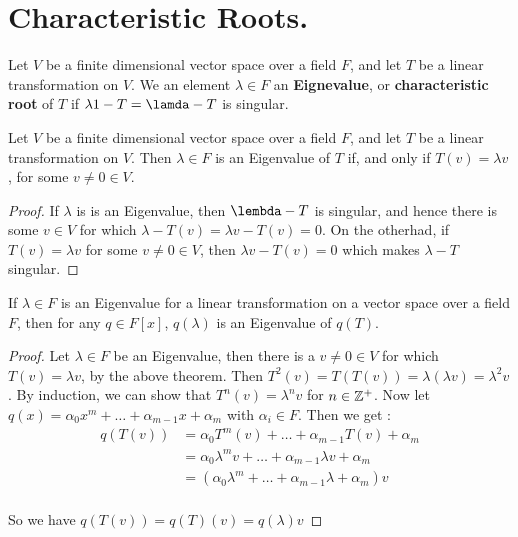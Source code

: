 \section{Characteristic Roots.}
\label{section2}

\begin{definition}
    Let $V$ be a finite dimensional vector space over a field  $F$, and let  $T$
    be a linear transformation on  $V$. We an element  $\lambda \in F$ an
    \textbf{Eignevalue}, or \textbf{characteristic root} of $T$ if
    $\lambda1-T=\lamda-T$ is singular.
\end{definition}

\begin{theorem}\label{3.2.1}
    Let $V$ be a finite dimensional vector space over a field  $F$, and let  $T$
    be a linear transformation on  $V$. Then  $\lambda \in F$ is an Eigenvalue
    of $T$ if, and only if  $T(v)=\lambda v$, for some $v \neq 0 \in V$.
\end{theorem}
\begin{proof}
    If $\lambda$ is is an Eigenvalue, then $\lembda-T$ is singular, and hence
    there is some  $v \in V$ for which  $\lambda-T(v)=\lambda v-T(v)=0$. On the
    otherhad, if $T(v)=\lambda v$ for some $v \neq 0 \in V$, then $\lambda
    v-T(v)=0$ which makes $\lambda-T$ singular.
\end{proof}

\begin{lemma}\label{3.2.2}
    If $\lambda \in F$  is an Eigenvalue for a linear transformation on a vector
    space over a field $F$, then for any $q \in F[x]$, $q(\lambda)$ is an
    Eigenvalue of $q(T)$.
\end{lemma}
\begin{proof}
    Let $\lambda \in F$ be an Eigenvalue, then there is a $v \neq 0 \in V$ for
    which  $T(v)=\lambda v$, by the above theorem. Then
    $T^2(v)=T(T(v))=\lambda(\lambda v)=\lambda^2v$. By induction, we can show
    that $T^n(v)=\lambda^nv$ for $n \in \mathbb{Z}^+$. Now let
    $q(x)=\alpha_0x^m+\dots+\alpha_{m-1}x+\alpha_m$ with $\alpha_i \in F$. Then
    we get :
        \begin{align*}
            q(T(v)) &=  \alpha_0T^m(v)+\dots+\alpha_{m-1}T(v)+\alpha_m \\
                    &=  \alpha_0\lambda^mv+\dots+\alpha_{m-1}\lambda v+\alpha_m \\
                    &=  (\alpha_0\lambda^m+\dots+\alpha_{m-1}\lambda+\alpha_m)v \\
        \end{align*}

        So we have $q(T(v))=q(T)(v)=q(\lambda)v$
\end{proof}

